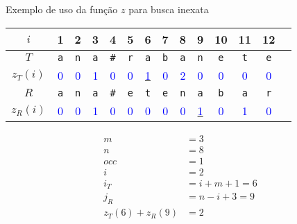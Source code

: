\begin{frame}[fragile]{Exemplo de uso da função $z$ para busca inexata}

    \begin{center}
    \begin{tabular}{c|ccccccccccccc}
        $i$ & 1 & 2 & 3 & 4 & 5 & 6 & 7 & 8 & 9 & 10 & 11 & 12 \\
        \hline
        $T$
& \texttt{\textcolor{red!80!black}{a}} 
& \texttt{\textcolor{red!80!black}{n}} 
& \texttt{\textcolor{red!80!black}{a}} 
& \texttt{\textcolor{red!80!black}{\#}} 
& \texttt{\textcolor{red!80!black}{r}} 
& \texttt{\textcolor{red!80!black}{a}} 
& \texttt{\textcolor{red!80!black}{b}} 
& \texttt{\textcolor{red!80!black}{a}} 
& \texttt{\textcolor{red!80!black}{n}} 
& \texttt{\textcolor{red!80!black}{e}} 
& \texttt{\textcolor{red!80!black}{t}} 
& \texttt{\textcolor{red!80!black}{e}} 
\\
        $z_T(i)$
& \textcolor{blue}{0} 
& \textcolor{blue}{0} 
& \textcolor{blue}{1} 
& \textcolor{blue}{0} 
& \textcolor{blue}{0} 
& \underline{\textcolor{blue}{1}}
& \textcolor{blue}{0} 
& {\textcolor{blue}{2}}
& \textcolor{blue}{0} 
& \textcolor{blue}{0} 
& \textcolor{blue}{0} 
& \textcolor{blue}{0} 
\\
        $R$
& \texttt{\textcolor{red!80!black}{a}} 
& \texttt{\textcolor{red!80!black}{n}} 
& \texttt{\textcolor{red!80!black}{a}} 
& \texttt{\textcolor{red!80!black}{\#}} 
& \texttt{\textcolor{red!80!black}{e}} 
& \texttt{\textcolor{red!80!black}{t}} 
& \texttt{\textcolor{red!80!black}{e}} 
& \texttt{\textcolor{red!80!black}{n}} 
& \texttt{\textcolor{red!80!black}{a}} 
& \texttt{\textcolor{red!80!black}{b}} 
& \texttt{\textcolor{red!80!black}{a}} 
& \texttt{\textcolor{red!80!black}{r}} 
\\
        $z_R(i)$
& \textcolor{blue}{0} 
& \textcolor{blue}{0} 
& \textcolor{blue}{1} 
& \textcolor{blue}{0} 
& \textcolor{blue}{0} 
& {\textcolor{blue}{0}}
& \textcolor{blue}{0} 
& {\textcolor{blue}{0}}
& \underline{\textcolor{blue}{1}}
& \textcolor{blue}{0} 
& \textcolor{blue}{1} 
& \textcolor{blue}{0} 
    \end{tabular}
    \end{center}

    \begin{align*}
        m &= 3 \\
        n &= 8 \\
        occ &= 1 \\
        i &= 2 \\
        i_T &= i + m + 1 = 6 \\
        j_R &= n - i + 3 = 9 \\
        z_T(6) + z_R(9) &= 2 \\
    \end{align*}
\end{frame}


